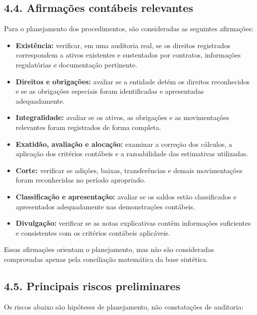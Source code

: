 \documentclass[
]{article}
\providecommand{\tightlist}{%
  \setlength{\itemsep}{0pt}\setlength{\parskip}{0pt}}
\begin{document}
\subsection{4.4. Afirmações contábeis
relevantes}\label{afirmauxe7uxf5es-contuxe1beis-relevantes}

Para o planejamento dos procedimentos, são consideradas as seguintes
afirmações:

\begin{itemize}
\tightlist
\item
  \textbf{Existência:} verificar, em uma auditoria real, se os direitos
  registrados correspondem a ativos existentes e sustentados por
  contratos, informações regulatórias e documentação pertinente.
\item
  \textbf{Direitos e obrigações:} avaliar se a entidade detém os
  direitos reconhecidos e se as obrigações especiais foram identificadas
  e apresentadas adequadamente.
\item
  \textbf{Integralidade:} avaliar se os ativos, as obrigações e as
  movimentações relevantes foram registrados de forma completa.
\item
  \textbf{Exatidão, avaliação e alocação:} examinar a correção dos
  cálculos, a aplicação dos critérios contábeis e a razoabilidade das
  estimativas utilizadas.
\item
  \textbf{Corte:} verificar se adições, baixas, transferências e demais
  movimentações foram reconhecidas no período apropriado.
\item
  \textbf{Classificação e apresentação:} avaliar se os saldos estão
  classificados e apresentados adequadamente nas demonstrações
  contábeis.
\item
  \textbf{Divulgação:} verificar se as notas explicativas contêm
  informações suficientes e consistentes com os critérios contábeis
  aplicáveis.
\end{itemize}

Essas afirmações orientam o planejamento, mas não são consideradas
comprovadas apenas pela conciliação matemática da base sintética.

\subsection{4.5. Principais riscos
preliminares}\label{principais-riscos-preliminares}

Os riscos abaixo são hipóteses de planejamento, não constatações de
auditoria:
\end{document}

